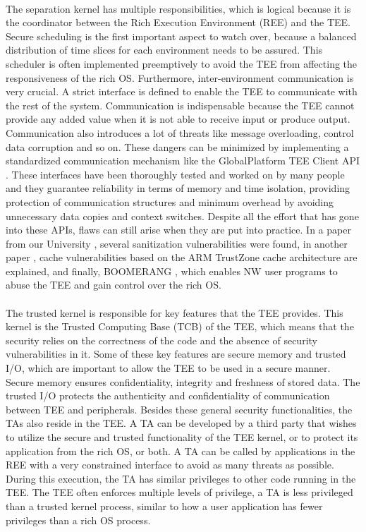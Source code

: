 \paragraph*{}
The separation kernel has multiple responsibilities, which is logical because it is the coordinator between the Rich Execution Environment (REE) and the TEE. Secure scheduling is the first important aspect to watch over, because a balanced distribution of time slices for each environment needs to be assured. This scheduler is often implemented preemptively to avoid the TEE from affecting the responsiveness of the rich OS. Furthermore, inter-environment communication is very crucial. A strict interface is defined to enable the TEE to communicate with the rest of the system. Communication is indispensable because the TEE cannot provide any added value when it is not able to receive input or produce output. Communication also introduces a lot of threats like message overloading, control data corruption and so on. These dangers can be minimized by implementing a standardized communication mechanism like the GlobalPlatform TEE Client API \cite{TEEClientAPI}. These interfaces have been thoroughly tested and worked on by many people and they guarantee reliability in terms of memory and time isolation, providing protection of communication structures and minimum overhead by avoiding unnecessary data copies and context switches. Despite all the effort that has gone into these APIs, flaws can still arise when they are put into practice. In a paper from our University \cite{VanBulckJo2019AToT}, several sanitization vulnerabilities were found, in another paper \cite{GuoPengfei2021RoAT}, cache vulnerabilities based on the ARM TrustZone cache architecture are explained, and finally, BOOMERANG \cite{Machiry2017BOOMERANGET}, which enables NW user programs to abuse the TEE and gain control over the rich OS.

\paragraph*{}
The trusted kernel is responsible for key features that the TEE provides. This kernel is the Trusted Computing Base (TCB) of the TEE, which means that the security relies on the correctness of the code and the absence of security vulnerabilities in it. Some of these key features are secure memory and trusted I/O, which are important to allow the TEE to be used in a secure manner. Secure memory ensures confidentiality, integrity and freshness of stored data. The trusted I/O protects the authenticity and confidentiality of communication between TEE and peripherals. Besides these general security functionalities, the TAs also reside in the TEE. A TA can be developed by a third party that wishes to utilize the secure and trusted functionality of the TEE kernel, or to protect its application from the rich OS, or both. A TA can be called by applications in the REE with a very constrained interface to avoid as many threats as possible. During this execution, the TA has similar privileges to other code running in the TEE. The TEE often enforces multiple levels of privilege, a TA is less privileged than a trusted kernel process, similar to how a user application has fewer privileges than a rich OS process.

